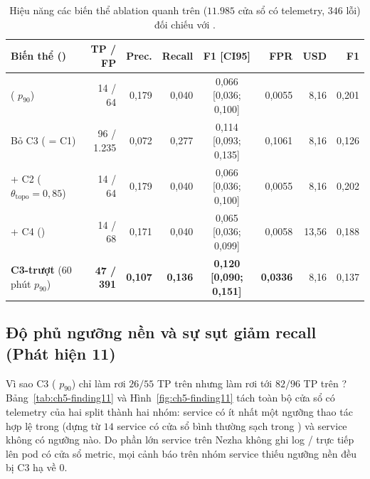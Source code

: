 \begin{table}[htbp]
  \centering
  \caption[Bảng ablation thành phần quanh CTAV trên test cạnh val]{Hiệu năng các biến thể ablation quanh \CTAV{} trên  ($11.985$ cửa sổ có telemetry, $346$ lỗi) đối chiếu với .}
  \label{tab:ch5-ablation-both}
  \scriptsize
  \renewcommand{\arraystretch}{1.15}
  \setlength{\tabcolsep}{2.5pt}
  \begin{tabularx}{\linewidth}{@{}Y r r r c r r r@{}}
    \toprule
    \textbf{Biến thể ()} & \textbf{TP / FP} & \textbf{Prec.} & \textbf{Recall} & \textbf{F1 [CI95]} & \textbf{FPR} & \textbf{USD} & \textbf{ F1} \\
    \midrule
    \textbf{\CTAV{}} ( $p_{90}$) & 14 / 64 & 0,179 & 0,040 & 0,066 [0,036; 0,100] & 0,0055 & 8,16 & 0,201 \\
    Bỏ C3 ( = C1) & 96 / 1.235 & 0,072 & 0,277 & 0,114 [0,093; 0,135] & 0,1061 & 8,16 & 0,126 \\
    + C2 ($\theta_{\text{topo}} = 0{,}85$) & 14 / 64 & 0,179 & 0,040 & 0,066 [0,036; 0,100] & 0,0055 & 8,16 & 0,202 \\
    + C4 () & 14 / 68 & 0,171 & 0,040 & 0,065 [0,036; 0,099] & 0,0058 & 13,56 & 0,188 \\
    \textbf{C3-trượt} (60 phút $p_{90}$) & \textbf{47 / 391} & \textbf{0,107} & \textbf{0,136} & \textbf{0,120 [0,090; 0,151]} & \textbf{0,0336} & 8,16 & 0,137 \\
    \bottomrule
  \end{tabularx}
\end{table}

\subsection{Độ phủ ngưỡng nền  và sự sụt giảm recall (Phát hiện 11)}
\label{sec:ch5-finding11}

Vì sao C3 ( $p_{90}$) chỉ làm rơi $26/55$ TP trên  nhưng làm rơi tới $82/96$ TP trên ? Bảng~\ref{tab:ch5-finding11} và Hình~\ref{fig:ch5-finding11} tách toàn bộ cửa sổ có telemetry của hai split thành hai nhóm: service có ít nhất một ngưỡng thao tác hợp lệ trong  (dựng từ $14$ service có cửa sổ bình thường sạch trong ) và service không có ngưỡng nào. Do phần lớn service trên Nezha không ghi log / trực tiếp lên pod có cửa sổ metric, mọi cảnh báo trên nhóm service thiếu ngưỡng nền  đều bị C3 hạ về $0$.

